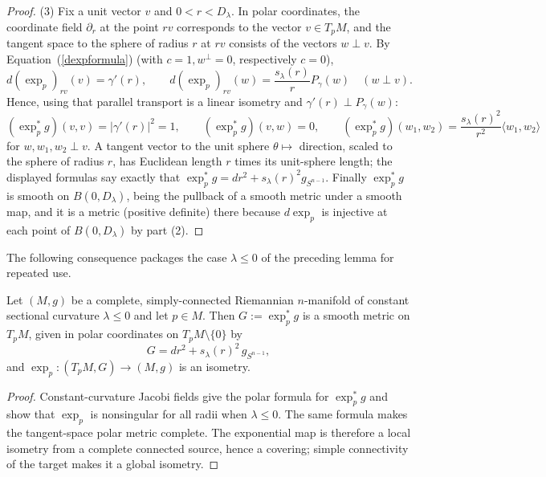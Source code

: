 \begin{proof}
(3) Fix a unit vector $v$ and $0<r<D_\lambda$. In polar coordinates,
the coordinate field $\partial_r$ at the point $rv$ corresponds to
the vector $v\in T_pM$, and the tangent space to the sphere of
radius $r$ at $rv$ consists of the vectors $w\perp v$. By
Equation~(\ref{dexpformula}) (with $c=1,w^\perp=0$, respectively
$c=0$),
$$d(\exp_p)_{rv}(v)=\gamma'(r),\qquad
d(\exp_p)_{rv}(w)=\frac{s_\lambda(r)}{r}P_\gamma(w)\quad (w\perp
v).$$
Hence, using that parallel transport is a linear isometry and
$\gamma'(r)\perp P_\gamma(w)$:
$$(\exp_p^*g)(v,v)=|\gamma'(r)|^2=1,\qquad
(\exp_p^*g)(v,w)=0,\qquad
(\exp_p^*g)(w_1,w_2)
=\frac{s_\lambda(r)^2}{r^2}\langle w_1,w_2\rangle$$
for $w,w_1,w_2\perp v$. A tangent vector to the unit sphere
$\theta\mapsto$ direction, scaled to the sphere of radius $r$, has
Euclidean length $r$ times its unit-sphere length; the displayed
formulas say exactly that
$\exp_p^*g=dr^2+s_\lambda(r)^2g_{S^{n-1}}$. Finally $\exp_p^*g$ is
smooth on $B(0,D_\lambda)$, being the pullback of a smooth metric
under a smooth map, and it is a metric (positive definite) there
because $d\exp_p$ is injective at each point of $B(0,D_\lambda)$ by
part (2).
\end{proof}

The following consequence packages the case $\lambda\le0$ of the
preceding lemma for repeated use.

\begin{lemma}
\label{lem:model-polar-isometry}


Let $(M,g)$ be a complete, simply-connected Riemannian $n$-manifold
of constant sectional curvature $\lambda\le0$ and let $p\in M$.
Then $G:=\exp_p^*g$ is a smooth metric on $T_pM$, given in
polar coordinates on $T_pM\setminus\{0\}$ by
$$G=dr^2+s_\lambda(r)^2\,g_{S^{n-1}},$$
and $\exp_p\colon(T_pM,G)\to(M,g)$ is an isometry.
\end{lemma}

\begin{proof}
\sketch
{}
Constant-curvature Jacobi fields give the polar formula for $\exp_p^*g$ and show that $\exp_p$ is nonsingular for all radii when $\lambda\le0$. The same formula makes the tangent-space polar metric complete. The exponential map is therefore a local isometry from a complete connected source, hence a covering; simple connectivity of the target makes it a global isometry.
\end{proof}

